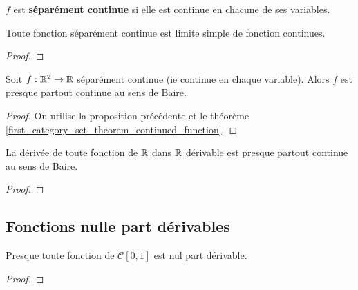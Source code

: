 \begin{definition}
	$f$ est \textbf{séparément continue} si elle est continue en chacune de ses
	variables.
\end{definition}

\begin{proposition}
	Toute fonction séparément continue est limite simple de fonction continues.
\end{proposition}

\begin{proof}
	
\end{proof}

\begin{corollary}
	Soit $f : \mathbb{R}^{2} \rightarrow \mathbb{R}$ séparément continue (ie continue en
	chaque variable). Alors $f$ est presque partout continue au sens de Baire.
\end{corollary}

\begin{proof}
	On utilise la proposition précédente et le théorème
	\ref{first_category_set_theorem_continued_function}.
\end{proof}

\begin{corollary}
	La dérivée de toute fonction de $\mathbb{R}$ dans $\mathbb{R}$ dérivable est presque
	partout continue au sens de Baire.
\end{corollary}

\begin{proof}
	
\end{proof}

\subsection{Fonctions nulle part dérivables}

\begin{theorem}
	Presque toute fonction de $\mathcal{C}[0, 1]$ est nul part dérivable.
\end{theorem}

\begin{proof}
	
\end{proof}
